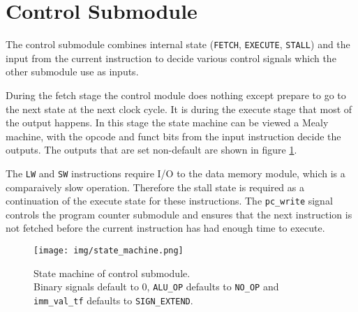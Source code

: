 \section{Control Submodule}
The control submodule combines internal state (\texttt{FETCH}, \texttt{EXECUTE}, \texttt{STALL}) and the input from the current instruction to decide various control signals which the other submodule use as inputs.

During the fetch stage the control module does nothing except prepare to go to the next state at the next clock cycle.
It is during the execute stage that most of the output happens.
In this stage the state machine can be viewed a Mealy machine,
with the opcode and funct bits from the input instruction decide the outputs.
The outputs that are set non-default are shown in figure \ref{fig:state_machine}.

The \texttt{LW} and \texttt{SW} instructions require I/O to the data memory module,
which is a comparaively slow operation.
Therefore the stall state is required as a continuation of the execute state for these instructions.
The \texttt{pc\_write} signal controls the program counter submodule and ensures that the next instruction is not fetched before the current instruction has had enough time to execute.

\begin{figure}[h]
    \centering
    \texttt{[image: img/state\_machine.png]}
    \caption{State machine of control submodule.\\Binary signals default to 0, \texttt{ALU\_OP} defaults to \texttt{NO\_OP} and \texttt{imm\_val\_tf} defaults to \texttt{SIGN\_EXTEND}.}
    \label{fig:state_machine}
\end{figure}

